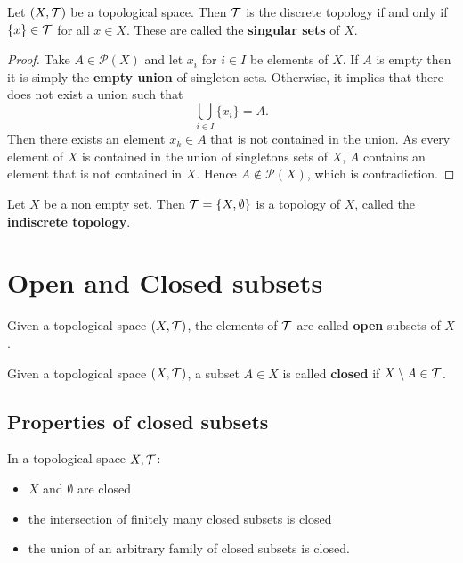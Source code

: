 \documentclass[../../main/main.tex]{subfiles}
\begin{document}
\begin{remark}
  Let $(X, \mathcal{T})$ be a topological space. Then $\mathcal{T}$ is the discrete topology if and only if $\{x\} \in \mathcal{T}$ for all $x \in X$. These are called the {\bf singular sets} of $X$.
\end{remark}
\begin{proof}
  Take $A \in \mathcal{P}(X)$ and let $x_{i}$ for $i \in I$ be elements of $X$. If $A$ is empty then it is simply the {\bf empty union} of singleton sets. Otherwise, it implies that there does not exist a union such that
  \begin{equation*}
    \bigcup_{i \in I} \{x_{i}\} = A.
  \end{equation*}
  Then there exists an element $x_{k} \in A$ that is not contained in the union. As every element of $X$ is contained in the union of singletons sets of $X$, $A$ contains an element that is not contained in $X$. Hence $A \notin \mathcal{P}(X)$, which is contradiction.
\end{proof}

\begin{definition}
  \label{def:indiscrete-topology}
  Let $X$ be a non empty set. Then $\mathcal{T} = \{X, \emptyset \}$ is a topology of $X$, called the {\bf indiscrete topology}.
\end{definition}

\section{Open and Closed subsets}
\label{sec:open-closed-subsets}

\begin{definition}
  Given a topological space $(X, \mathcal{T})$, the elements of $\mathcal{T}$ are called {\bf open} subsets of $X$.
\end{definition}

\begin{definition}
  Given a topological space $(X, \mathcal{T})$, a subset $A \in X$ is called {\bf closed} if $X \setminus A \in \mathcal{T}$.
\end{definition}

\subsection{Properties of closed subsets}
\label{sec:prop-closed-subsets}

In a topological space $X, \mathcal{T}$:
\begin{itemize}
    \item $X$ and $\emptyset$ are closed
    \item the intersection of finitely many closed subsets is closed
    \item the union of an arbitrary family of closed subsets is closed.
\end{itemize}
\end{document}
